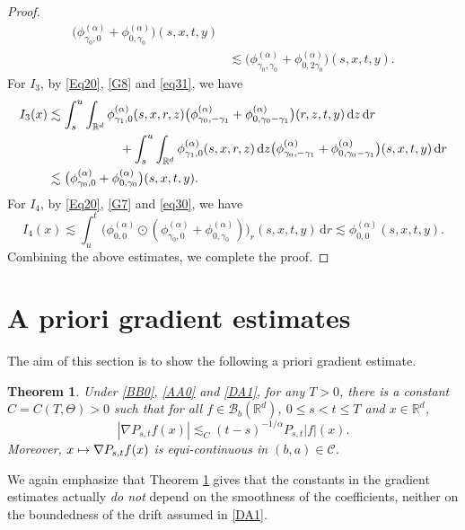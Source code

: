 \documentclass[11pt]{article}
\numberwithin{equation}{section}\providecommand{\asymp}{\mathrel{\sim}}
\def\mto{\mathchoice{\longmapsto}{\mapsto}{\mapsto}{\mapsto}}
\theoremstyle{plain}
\newtheorem{theorem}{Theorem}[section]
\theoremstyle{definition}
\newcommand\cB{{\mathcal B}}
\newcommand\mR{\mathbb{R}}
\newcommand\1{{\mathbf{1}}}
\newcommand\sC{{\mathscr C}}
\newcommand{\dif}{\,\mathrm{d}}
\begin{document}
\begin{proof}
\begin{align*}
\bigl(\phi^{(\alpha)}_{\gamma_0,0}+\phi^{(\alpha)}_{0,\gamma_0}\bigr)(s,x,t,y)
\\&\lesssim\bigl(\phi^{(\alpha)}_{\gamma_0,\gamma_0}+\phi^{(\alpha)}_{0,2\gamma_0}\bigr)(s,x,t,y).
\end{align*}
For $I_3$, by {\eqref{Eq20}}, \eqref{G8} and \eqref{eq31}, we have
\begin{align*}
I_3(x)&\lesssim\int^u_s\int_{\mR^d}\phi^{(\alpha)}_{\gamma_1,0}(s,x,r,z)\bigl(\phi^{(\alpha)}_{\gamma_0,-\gamma_1}
+\phi^{(\alpha)}_{0,\gamma_0-\gamma_1}\bigr)(r,z,t,y)\dif z\dif r\\
&\hspace*{2cm}+\int^u_s\int_{\mR^d}\phi^{(\alpha)}_{\gamma_1,0}(s,x,r,z)\dif z
\bigl(\phi^{(\alpha)}_{\gamma_0,-\gamma_1}
+\phi^{(\alpha)}_{0,\gamma_0-\gamma_1}\bigr)(s,x,t,y)\dif r\\
&\lesssim \bigl(\phi^{(\alpha)}_{\gamma_0,0}+\phi^{(\alpha)}_{0,\gamma_0}\bigr)(s,x,t,y).
\end{align*}
For $I_4$, by \eqref{Eq20}, \eqref{G7} and \eqref{eq30}, we have
\begin{equation*}
I_4(x)\lesssim\int^t_u\bigl(\phi^{(\alpha)}_{0,0}\odot(\phi^{(\alpha)}_{\gamma_0,0}
+\phi^{(\alpha)}_{0,\gamma_0})\bigr)_r(s,x,t,y)\dif r\lesssim\phi^{(\alpha)}_{0,0}(s,x,t,y).
\end{equation*}
Combining the above estimates, we complete the proof.
\end{proof}

\section{A priori gradient estimates}\label{SEC_GRAD}

The aim of this section is to show the following a priori gradient estimate.
\begin{theorem}\label{Th41}
Under \eqref{BB0}, \eqref{AA0} and \eqref{DA1}, for any $T>0$, there is a constant $C=C(T,\Theta)>0$ such that
for all $f\in \cB_b(\mR^d)$,
$0\leq s<t\leq T$ and $x\in\mR^d$,
\begin{equation}\label{DQ1}
|\nabla P_{s,t}f(x)|\lesssim_C (t-s)^{-1/\alpha}P_{s,t}|f|(x).
\end{equation}
Moreover, $x\mto \nabla P_{s,t}f(x)$ is equi-continuous in $(b,a)\in\sC$.
\end{theorem}
{We again emphasize that Theorem \ref{Th41} gives that the constants in the gradient estimates actually \emph{do not} depend on the smoothness of the coefficients, neither on the boundedness of the drift assumed in \eqref{DA1}}.
\end{document}
